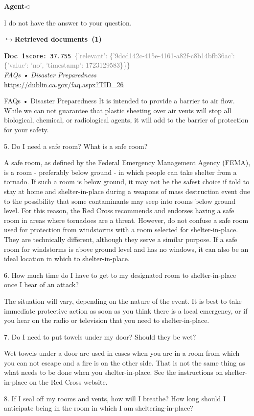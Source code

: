 \documentclass[a4paper,11pt]{article}
\begin{document}
\noindent\hfill{\small\textcolor{agentcolor}{\textbf{Agent\enspace$\triangleleft$}}}
\begin{agentbubble}
I do not have the answer to your question.
\end{agentbubble}
\noindent\hfill{\footnotesize\textcolor{doccolor}{\textbf{$\hookrightarrow$\enspace Retrieved documents~(1)}}}
\begin{docenv}
{\footnotesize\textcolor{doccolor}{\textbf{Doc~1}}}\hfill{\tiny\texttt{score:~37.755}}\ {\tiny\textcolor{gray}{\{'relevant': \{'9dcd142c-415e-4161-a82f-c8b14bfb36ac': \{'value': 'no', 'timestamp': 1723129583\}\}\}}}\\[3pt]
{\small\textit{FAQs • Disaster Preparedness}}\\[2pt]
{\tiny\url{https://dublin.ca.gov/faq.aspx?TID=26}}\\[4pt]
{\footnotesize FAQs • Disaster Preparedness
It is intended to provide a barrier to air flow. While we can not guarantee that plastic sheeting over air vents will stop all biological, chemical, or radiological agents, it will add to the barrier of protection for your safety.	

5.
Do I need a safe room? What is a safe room?

A safe room, as defined by the Federal Emergency Management Agency (FEMA), is a room - preferably below ground - in which people can take shelter from a tornado. If such a room is below ground, it may not be the safest choice if told to stay at home and shelter-in-place during a weapons of mass destruction event due to the possibility that some contaminants may seep into rooms below ground level. For this reason, the Red Cross recommends and endorses having a safe room in areas where tornadoes are a threat. However, do not confuse a safe room used for protection from windstorms with a room selected for shelter-in-place. They are technically different, although they serve a similar purpose. If a safe room for windstorms is above ground level and has no windows, it can also be an ideal location in which to shelter-in-place.	

6.
How much time do I have to get to my designated room to shelter-in-place once I hear of an attack?

The situation will vary, depending on the nature of the event. It is best to take immediate protective action as soon as you think there is a local emergency, or if you hear on the radio or television that you need to shelter-in-place.	

7.
Do I need to put towels under my door? Should they be wet?

Wet towels under a door are used in cases when you are in a room from which you can not escape and a fire is on the other side. That is not the same thing as what needs to be done when you shelter-in-place. See the instructions on shelter-in-place on the Red Cross website.	

8.
If I seal off my rooms and vents, how will I breathe? How long should I anticipate being in the room in which I am sheltering-in-place?}
\end{docenv}
\end{document}

